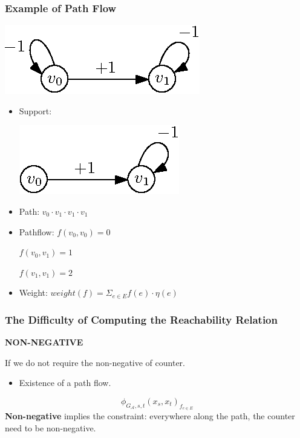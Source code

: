 \documentclass[11pt]{beamer}
\begin{document}
\begin{frame}\frametitle{Example of Path Flow}

\begin{example}
\begin{multicols}{2}

\includegraphics[scale=1]{wg2.eps}
\begin{itemize}

\item Support: 

\includegraphics[scale=1]{support.eps}

\item Path: $v_0\cdot v_1\cdot v_1 \cdot v_1$

\item Pathflow: $f(v_0,v_0) = 0$ 

$f(v_0,v_1) = 1$

$ f(v_1,v_1) = 2$

\item Weight: $weight(f) = \Sigma_{e\in E} f(e)\cdot \eta(e)$
\end{itemize}
\end{multicols}

\end{example}
\end{frame}

\begin{frame}\frametitle{The Difficulty of Computing the Reachability Relation}
\begin{center}
\large
\textbf{NON-NEGATIVE}
\end{center}\pause
If we do not require the non-negative of counter.

\begin{itemize}
\item Existence of a path flow.
\end{itemize}

\pause
\[\phi_{G_{\mathcal{A}}, s,t}(x_s, x_t)_{f_{e\in E}}\]
\textbf{Non-negative} implies the constraint:
everywhere along the path, the counter need to be non-negative.
\end{frame}
\end{document}
